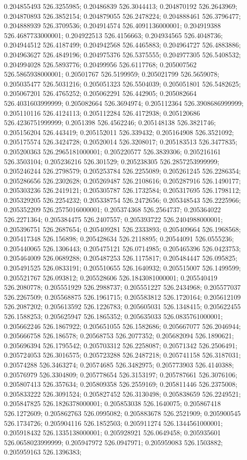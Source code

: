 0.204855493 526.3255985; 0.20486839 526.3044413; 0.204870192 526.2643969; 0.204870893 526.3852154; 0.204879055 526.2478224; 0.204888461 526.3796477; 0.204888939 526.3709536; 0.204914574 526.4091136000001; 0.204919388 526.4687733000001; 0.204922513 526.4156663; 0.204934565 526.4048736; 0.204944512 526.4187499; 0.204942568 526.4465883; 0.204964727 526.4883886; 0.204963627 526.4849196; 0.204975376 526.5375555; 0.204977305 526.5408532; 0.204994028 526.5893776; 0.20499956 526.6117768; 0.205007562 526.5865938000001; 0.20501767 526.5199959; 0.205021799 526.5659078; 0.205035477 526.5031216; 0.205051323 526.5504039; 0.205051801 526.5482625; 0.205067201 526.4765252; 0.205062291 526.442905; 0.205082664 526.4031603999999; 0.205082664 526.3694974; 0.205112364 526.3908686999999; 0.205110116 526.4124113; 0.205112284 526.4172938; 0.205120686 526.4236751999999; 0.2051398 526.4562246; 0.205148138 526.3821746; 0.205156204 526.443419; 0.205152011 526.339432; 0.205164908 526.3521092; 0.205175574 526.3424728; 0.20520014 526.3208017; 0.205183513 526.3477835; 0.205200363 526.2965181000001; 0.205220577 526.3839306; 0.205216161 526.3503104; 0.205236216 526.301529; 0.205238305 526.2857253999999; 0.205246244 526.2798579; 0.205253784 526.2255089; 0.205261245 526.2286354; 0.205286656 526.2302628; 0.205269487 526.2108616; 0.205287916 526.1490177; 0.205303236 526.2419121; 0.205305787 526.1732584; 0.205317695 526.1798112; 0.205329205 526.2254232; 0.205338754 526.2472656; 0.205348543 526.2225966; 0.205352209 526.2575016000001; 0.205374368 526.2564737; 0.205364022 526.2271364; 0.205384475 526.2407557; 0.205393722 526.2404988000001; 0.205396751 526.2687654; 0.205409281 526.2333893; 0.205409664 526.1968568; 0.205417348 526.156898; 0.205428634 526.2118895; 0.20544091 526.0555236; 0.205440065 526.1306443; 0.205475121 526.0714985; 0.205465396 526.0423753; 0.205464009 526.0689288; 0.205487253 526.1175817; 0.205484447 526.095825; 0.205491525 526.0833191; 0.205510655 526.1640932; 0.205515007 526.1499599; 0.205521767 526.093812; 0.205528606 526.1843081000001; 0.205540419 526.2080778; 0.205551929 526.2988737; 0.205551227 526.2434968; 0.205577037 526.2267509; 0.205568875 526.1961715; 0.205583812 526.1720164; 0.205612109 526.2087202; 0.205613592 526.1226783; 0.205605031 526.1348415; 0.205622455 526.1588253; 0.205625947 526.1865352; 0.205635033 526.0835761000001; 0.205662246 526.1867922; 0.205651055 526.1582686; 0.205667077 526.2046944; 0.205666758 526.186578; 0.20568753 526.2077352; 0.205682094 526.1890621; 0.205696394 526.1795542; 0.205703312 526.2258087; 0.20571342 526.2506491; 0.205724053 526.3016575; 0.205723288 526.2487218; 0.205741158 526.3187031; 0.20574288 526.3463274; 0.20574685 526.3482975; 0.205773903 526.4140388; 0.20576979 526.3304809; 0.205778654 526.3153197; 0.205787661 526.3076106; 0.205807413 526.357634; 0.205809358 526.2559169; 0.205811446 526.2375008; 0.205833222 526.3091524; 0.205827452 526.3130498; 0.205838659 526.2249521; 0.205847825 526.1826378000001; 0.205853038 526.1640075; 0.205867418 526.1272609; 0.205862763 526.0995082; 0.205883678 526.2521909; 0.205900545 526.1734726; 0.205904116 526.1852503; 0.205911274 526.1344561000001; 0.205918432 526.1335138000001; 0.205928921 526.0649458; 0.205935601 526.0658023999999; 0.205947972 526.0947971; 0.205959083 526.1503882; 0.205959163 526.1396383; 
